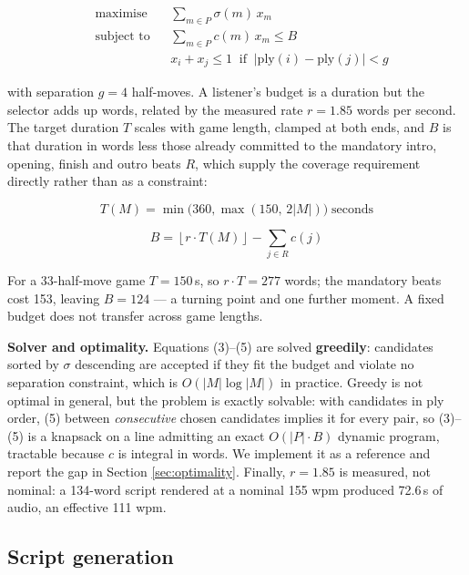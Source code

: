 \documentclass[conference]{IEEEtran}
\begin{document}
\begin{align}
&\text{maximise} && \sum_{m \in P} \sigma(m)\, x_m \\
&\text{subject to} && \sum_{m \in P} c(m)\, x_m \leq B \\
&&& x_i + x_j \leq 1 \;\;\text{if}\;\; |\mathrm{ply}(i) - \mathrm{ply}(j)| < g
\end{align}

\noindent with separation $g = 4$ half-moves. A listener's budget is a
duration but the selector adds up words, related by the measured rate
$r = 1.85$ words per second. The target duration $T$ scales with game
length, clamped at both ends, and $B$ is that duration in words less those
already committed to the mandatory intro, opening, finish and outro beats
$R$, which supply the coverage requirement directly rather than as a
constraint:

\begin{equation}
T(M) = \min\bigl(360, \max(150,\, 2|M|)\bigr) \;\text{seconds}
\end{equation}

\begin{equation}
B = \left\lfloor r \cdot T(M) \right\rfloor - \sum_{j \in R} c(j)
\end{equation}

For a 33-half-move game $T = 150$\,s, so $r \cdot T = 277$ words; the
mandatory beats cost 153, leaving $B = 124$ --- a turning point and one
further moment. A fixed budget does not transfer across game lengths.

\textbf{Solver and optimality.} Equations (3)--(5) are solved
\textbf{greedily}: candidates sorted by $\sigma$ descending are accepted if
they fit the budget and violate no separation constraint, which is
$O(|M| \log |M|)$ in practice. Greedy is not optimal in general, but the
problem is exactly solvable: with candidates in ply order, (5) between
\emph{consecutive} chosen candidates implies it for every pair, so (3)--(5)
is a knapsack on a line admitting an exact $O(|P| \cdot B)$ dynamic program,
tractable because $c$ is integral in words. We implement it as a reference
and report the gap in Section \ref{sec:optimality}. Finally, $r = 1.85$ is
measured, not nominal: a 134-word script rendered at a nominal 155 wpm
produced 72.6\,s of audio, an effective 111 wpm.

\subsection{Script generation}
\end{document}
